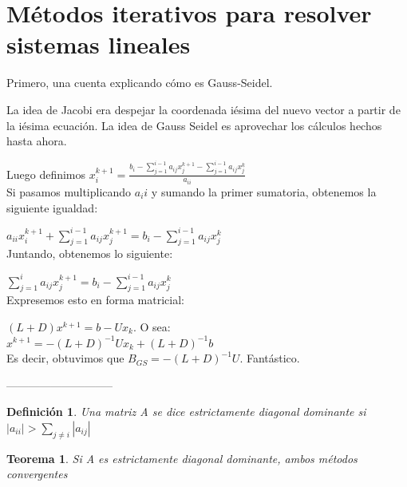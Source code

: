 \documentclass[10pt,a4paper,final]{report}
\newtheorem{theorem}{Teorema}
\newtheorem{definition}{Definición}
\begin{document}
{%





\section{Métodos iterativos para resolver sistemas lineales}

Primero, una cuenta explicando cómo es Gauss-Seidel.

La idea de Jacobi era despejar la coordenada iésima del nuevo vector a partir de la iésima ecuación. La idea de Gauss Seidel es aprovechar los cálculos hechos hasta ahora.

Luego definimos $x_i^{k+1}=\frac{b_i - \displaystyle \sum_{j=1}^{i-1}a_{ij}x_j^{k+1}-\displaystyle \sum_{j=1}^{i-1}a_{ij}x_j^{k}}{a_{ii}}$\\

Si pasamos multiplicando $a_ii$ y sumando la primer sumatoria, obtenemos la siguiente igualdad:

$a_{ii} x_i^{k+1} + \displaystyle \sum_{j=1}^{i-1}a_{ij}x_j^{k+1} =  b_i - \displaystyle \sum_{j=1}^{i-1} a_{ij} x_j^{k}$\\

Juntando, obtenemos lo siguiente:

$\displaystyle \sum_{j=1}^{i}a_{ij}x_j^{k+1} =  b_i - \displaystyle \sum_{j=1}^{i-1} a_{ij} x_j^{k}$\\

Expresemos esto en forma matricial:

$(L+D) x^{k+1} = b - U x_k$. O sea:\\

$x^{k+1} = - (L+D)^{-1} U x_k + (L+D)^{-1} b$\\

Es decir, obtuvimos que $B_{GS} = - (L+D)^{-1} U$. Fantástico.

-----------------------------


\begin{definition}Una matriz A se dice estrictamente diagonal dominante si $|a_{ii}| > \displaystyle \sum_{j\neq i} |a_{ij}|$
\end{definition}

\begin{theorem}Si A es estrictamente diagonal dominante, ambos métodos convergentes
\end{theorem}

}
\end{document}
